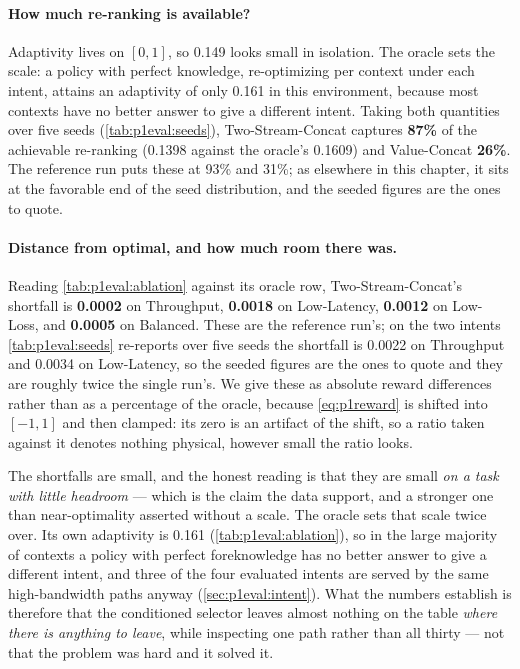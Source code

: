 \paragraph{How much re-ranking is available?} Adaptivity lives on $[0,1]$, so 0.149 looks small in
isolation. The oracle sets the scale: a policy with perfect knowledge, re-optimizing per context under
each intent, attains an adaptivity of only 0.161 in this environment, because most contexts have no
better answer to give a different intent. Taking both quantities over five seeds
(\cref{tab:p1eval:seeds}), Two-Stream-Concat captures \textbf{87\%} of the achievable re-ranking
(0.1398 against the oracle's 0.1609) and Value-Concat \textbf{26\%}. The reference run puts these at
93\% and 31\%; as elsewhere in this chapter, it sits at the favorable end of the seed distribution, and
the seeded figures are the ones to quote.

\paragraph{Distance from optimal, and how much room there was.} Reading \cref{tab:p1eval:ablation}
against its oracle row, Two-Stream-Concat's shortfall is \textbf{0.0002} on Throughput, \textbf{0.0018}
on Low-Latency, \textbf{0.0012} on Low-Loss, and \textbf{0.0005} on Balanced. These are the reference
run's; on the two intents \cref{tab:p1eval:seeds} re-reports over five seeds the shortfall is 0.0022 on
Throughput and 0.0034 on Low-Latency, so the seeded figures are the ones to quote and they are roughly
twice the single run's. We give these as absolute
reward differences rather than as a percentage of the oracle, because \cref{eq:p1reward} is shifted into
$[-1,1]$ and then clamped: its zero is an artifact of the shift, so a ratio taken against it denotes
nothing physical, however small the ratio looks.

The shortfalls are small, and the honest reading is that they are small \emph{on a task with little
headroom} --- which is the claim the data support, and a stronger one than near-optimality asserted
without a scale. The oracle sets that scale twice over. Its own adaptivity is 0.161
(\cref{tab:p1eval:ablation}), so in the large majority of contexts a policy with perfect foreknowledge
has no better answer to give a different intent, and three of the four evaluated intents are served by
the same high-bandwidth paths anyway (\cref{sec:p1eval:intent}). What the numbers establish is therefore
that the conditioned selector leaves almost nothing on the table \emph{where there is anything to leave},
while inspecting one path rather than all thirty --- not that the problem was hard and it solved it.

